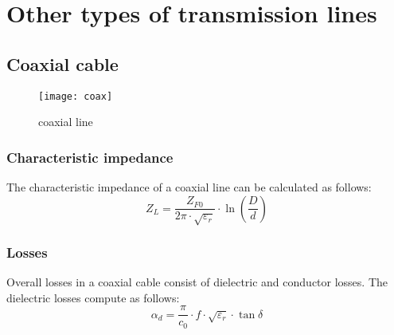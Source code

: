 %
%
%
%

\chapter{Other types of transmission lines}

\section{Coaxial cable}

\begin{figure}[ht]
\begin{center}
\texttt{[image: coax]}
\end{center}
\caption{coaxial line}
\label{fig:coax}
\end{figure}
\FloatBarrier

\subsection{Characteristic impedance}

The characteristic impedance of a coaxial line can be calculated as follows:
\begin{equation}
Z_L = \dfrac{Z_{F0}}{2\pi\cdot\sqrt{\varepsilon_r}}\cdot\ln{\left(\dfrac{D}{d}\right)}
\end{equation}

\subsection{Losses}

Overall losses in a coaxial cable consist of dielectric and conductor
losses.  The dielectric losses compute as follows:
\begin{equation}
\alpha_d = \dfrac{\pi}{c_0}\cdot f\cdot \sqrt{\varepsilon_r} \cdot \tan{\delta}
\end{equation}

